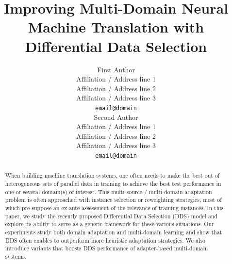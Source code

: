 \documentclass[11pt,a4paper]{article}
\title{Improving Multi-Domain Neural Machine Translation with Differential Data Selection}
\author{First Author \\
  Affiliation / Address line 1 \\
  Affiliation / Address line 2 \\
  Affiliation / Address line 3 \\
  \texttt{email@domain} \\\And
  Second Author \\
  Affiliation / Address line 1 \\
  Affiliation / Address line 2 \\
  Affiliation / Address line 3 \\
  \texttt{email@domain} \\}
\date{}
\newcommand{\fyTodo}[1]{\Todo[FY:]{\textcolor{orange}{#1}}}
\begin{document}
\maketitle
\setlength{\abovedisplayskip}{2pt}
\setlength{\belowdisplayskip}{2pt}
\begin{abstract}
  When building machine translation systems, one often needs to make the best out of heterogeneous sets of parallel data in training to achieve the best test performance in one or several domain(s) of interest. This multi-source / multi-domain adaptation problem is often approached with instance selection or reweighting strategies, most of which pre-suppose an ex-ante assessment of the relevance of training instances. In this paper, we study the recently proposed Differential Data Selection (DDS) model and explore its ability to serve as a generic framework for these various situations. Our experiments study both domain adaptation and multi-domain learning and show that DDS often enables to outperform more heuristic adaptation strategies. We also introduce variants that boosts DDS performance of adapter-based multi-domain systems.\fyTodo{Keep this part ?}

\end{abstract}
\end{document}
